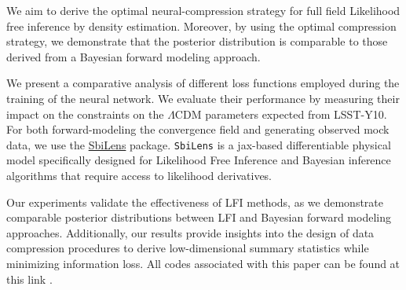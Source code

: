 \documentclass{aa}
\newcommand{\github}{\href{https://github.com/dlanzieri/WL_Implicit-Inference}{\faGithub}} %
\begin{document}
    {We aim to derive the optimal neural-compression strategy for full field Likelihood free inference by density estimation. Moreover, by using the optimal compression strategy, we demonstrate that the posterior distribution is comparable to those derived from a Bayesian forward modeling approach.}  
    { We present a comparative analysis of different loss functions employed during the training of the neural network. We  evaluate their performance by measuring their impact on the constraints on the $\Lambda$CDM parameters expected from LSST-Y10.
    For both forward-modeling the convergence field and generating observed mock data, we use the \href{https://github.com/DifferentiableUniverseInitiative/sbi_lens}{\url{SbiLens}} package. 
    \texttt{SbiLens} is a jax-based differentiable physical model specifically designed for Likelihood Free Inference and Bayesian inference algorithms that require access to likelihood derivatives.
    

    
    
    
    
    }
   {Our experiments validate the effectiveness of LFI methods,  as we demonstrate comparable posterior distributions between LFI and Bayesian forward modeling approaches.
   Additionally, our results provide insights into the design of data compression procedures to derive low-dimensional summary statistics while minimizing information loss. All codes associated with this paper can be found at this link \github.}
   {}


   \maketitle

\end{document}
